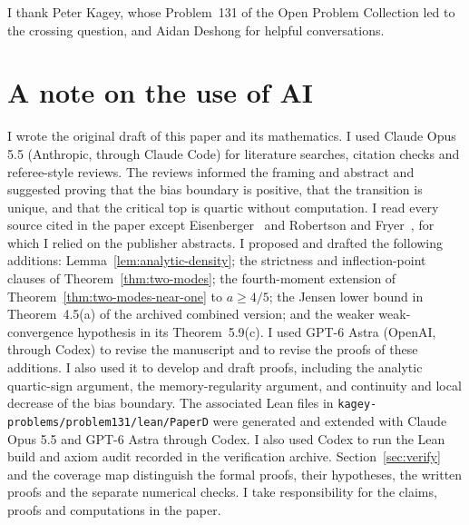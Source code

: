 \documentclass[EJP,preprint]{ejpecp}
\begin{document}
\raggedbottom






\begin{acks}
I thank Peter Kagey, whose Problem~131 of the Open Problem Collection
\cite{kagey131} led to the crossing question, and Aidan Deshong for
helpful conversations.
\end{acks}

\section*{A note on the use of AI}
I wrote the original draft of this paper and its mathematics. I used Claude
Opus 5.5 (Anthropic, through Claude Code) for literature searches, citation
checks and referee-style reviews. The reviews informed the framing and
abstract and suggested proving that the bias boundary is positive, that
the transition is unique, and that the critical top is quartic without
computation. I read every source cited in the paper except
Eisenberger~\cite{eisenberger1964} and Robertson and
Fryer~\cite{robertsonfryer1969}, for which I relied on the publisher abstracts.
I proposed and drafted the following
additions: Lemma~\ref{lem:analytic-density}; the strictness and
inflection-point clauses of Theorem~\ref{thm:two-modes}; the fourth-moment
extension of Theorem~\ref{thm:two-modes-near-one} to $a\ge4/5$; the Jensen
lower bound in Theorem~4.5(a) of the archived combined version; and the weaker
weak-convergence hypothesis in its Theorem~5.9(c).
I used GPT-6 Astra (OpenAI, through Codex) to revise the manuscript and to
revise the proofs of these additions. I also used it to develop and draft
proofs, including the analytic quartic-sign argument, the memory-regularity
argument, and continuity and local decrease of the bias boundary.
The associated Lean files in
\nolinkurl{kagey-problems/problem131/lean/PaperD} were generated and extended
with Claude Opus 5.5 and GPT-6 Astra through Codex. I also used Codex to run
the Lean build and axiom audit recorded in the verification archive.
Section~\ref{sec:verify} and the coverage map distinguish the formal proofs,
their hypotheses, the written proofs and the separate numerical checks.
I take responsibility for the claims, proofs and computations in the paper.
\end{document}
